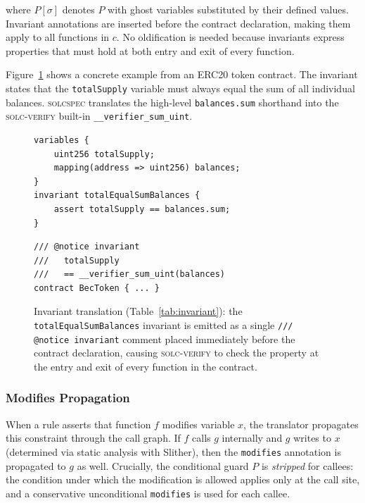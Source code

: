 \noindent where $P[\sigma]$ denotes $P$ with ghost variables substituted by their defined values. Invariant annotations are inserted before the contract declaration, making them apply to all functions in $c$. No oldification is needed because invariants express properties that must hold at both entry and exit of every function.

Figure~\ref{fig:invariant-example} shows a concrete example from an ERC20 token contract. The invariant states that the \texttt{totalSupply} variable must always equal the sum of all individual balances. \textsc{solcspec} translates the high-level \texttt{balances.sum} shorthand into the \textsc{solc-verify} built-in \texttt{\_\_verifier\_sum\_uint}.

\begin{figure}[h]
\centering
\begin{minipage}{0.47\textwidth}
\begin{lstlisting}[style=solstyle]
variables {
    uint256 totalSupply;
    mapping(address => uint256) balances;
}
invariant totalEqualSumBalances {
    assert totalSupply == balances.sum;
}
\end{lstlisting}
\end{minipage}
\hfill
\begin{minipage}{0.47\textwidth}
\begin{lstlisting}[style=solstyle]
/// @notice invariant
///   totalSupply
///   == __verifier_sum_uint(balances)
contract BecToken { ... }
\end{lstlisting}
\end{minipage}
\caption{Invariant translation (Table~\ref{tab:invariant}): the \texttt{totalEqualSumBalances} invariant is emitted as a single \texttt{/// @notice invariant} comment placed immediately before the contract declaration, causing \textsc{solc-verify} to check the property at the entry and exit of every function in the contract.}
\label{fig:invariant-example}
\end{figure}

\subsubsection{Modifies Propagation}

When a rule asserts that function $f$ modifies variable $x$, the translator propagates this constraint through the call graph. If $f$ calls $g$ internally and $g$ writes to $x$ (determined via static analysis with Slither), then the \texttt{modifies} annotation is propagated to $g$ as well. Crucially, the conditional guard $P$ is \emph{stripped} for callees: the condition under which the modification is allowed applies only at the call site, and a conservative unconditional \texttt{modifies} is used for each callee.

